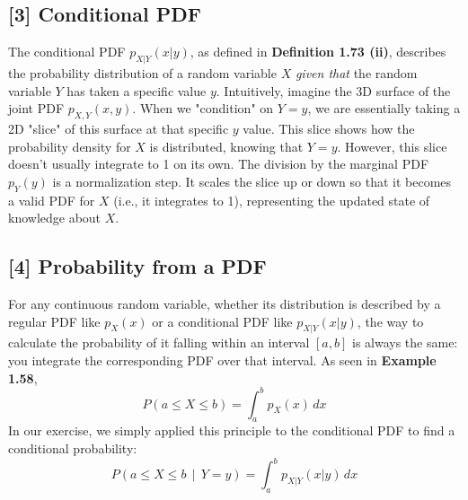 \documentclass[11pt,a4paper]{article}
\begin{document}
\subsection*{\hypertarget{note3}{[3]} Conditional PDF}
The conditional PDF $p_{X|Y}(x|y)$, as defined in \textbf{Definition 1.73 (ii)}, describes the probability distribution of a random variable $X$ \emph{given that} the random variable $Y$ has taken a specific value $y$.
Intuitively, imagine the 3D surface of the joint PDF $p_{X,Y}(x,y)$. When we "condition" on $Y=y$, we are essentially taking a 2D "slice" of this surface at that specific $y$ value. This slice shows how the probability density for $X$ is distributed, knowing that $Y=y$. However, this slice doesn't usually integrate to 1 on its own. The division by the marginal PDF $p_Y(y)$ is a normalization step. It scales the slice up or down so that it becomes a valid PDF for $X$ (i.e., it integrates to 1), representing the updated state of knowledge about $X$.

\subsection*{\hypertarget{note4}{[4]} Probability from a PDF}
For any continuous random variable, whether its distribution is described by a regular PDF like $p_X(x)$ or a conditional PDF like $p_{X|Y}(x|y)$, the way to calculate the probability of it falling within an interval $[a,b]$ is always the same: you integrate the corresponding PDF over that interval. As seen in \textbf{Example 1.58},
\[ P(a \le X \le b) = \int_a^b p_X(x) \,dx \]
In our exercise, we simply applied this principle to the conditional PDF to find a conditional probability:
\[ P\left(a \le X \le b \, \middle| \, Y=y\right) = \int_a^b p_{X|Y}(x|y) \,dx \]
\end{document}
